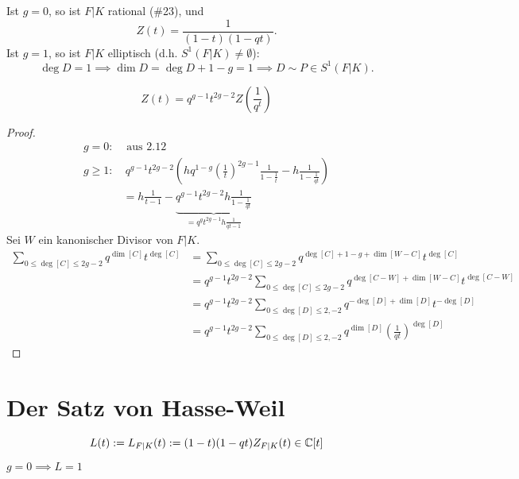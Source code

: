 \begin{beispiel}
    Ist \emph{$g=0$}, so ist $F|K$ rational (\#23), und 
    $$Z(t) = \frac{1}{(1-t)(1-qt)}.$$
    Ist \emph{$g=1$}, so ist $F|K$ elliptisch (d.h. $S^1(F|K) \ne \emptyset$):
    $$ \deg D = 1 \implies \dim D = \deg D + 1 -g = 1 \implies D \sim P \in S^1(F|K). $$
\end{beispiel}

\begin{satz}[Funktionalgleichung]
    $$ Z(t) = q^{g-1}t^{2g -2}Z\left(\frac{1}{q^t}\right) $$
\end{satz}
\begin{proof}
    \begin{align*}
        g=0:& \text{ aus 2.12}\\
        g \geq 1:&~ q^{g -1}t^{2g-2}\left(hq^{1-g}\left(\frac{1}{t}\right)^{2g -1}\frac{1}{1-\frac{1}{t}}-h\frac{1}{1-\frac{1}{qt}}\right)\\
        & = h \frac{1}{t-1} - \underbrace{q^{g-1}t^{2g-2}h\frac{1}{1-\frac{1}{qt}}}_{= q^gt^{2g-1}h\frac{1}{qt -1}}
    \end{align*}
    Sei $W$ ein kanonischer Divisor von $F|K$.
    \begin{align*}
        \sum_{0 \leq \deg [C] \leq 2g -2} q^{\dim[C]}t^{\deg [C]} &= \sum_{0 \leq \deg [C] \leq 2g -2} q^{\deg[C] + 1 - g + \dim[W-C]}t^{\deg [C]}\\
            &= q^{g -1}t^{2g-2} \sum_{0 \leq \deg [C] \leq 2g -2} q^{\deg[C-W]+\dim[W-C]}t^{\deg [C-W]}\\
            &= q^{g-1}t^{2g-2} \sum_{0 \leq \deg[D]\leq2,-2} q^{-\deg[D]+\dim[D]}t^{-\deg[D]}\\
            &= q^{g-1}t^{2g-2} \sum_{0 \leq \deg[D]\leq2,-2} q^{\dim [D]}\left(\frac{1}{qt}\right)^{\deg[D]}
    \end{align*}
\end{proof}

\section{Der Satz von Hasse-Weil}

\begin{definition}
    $$ L(t) := L_{F|K}(t): = (1-t)(1-qt)Z_{F|K}(t) \in \mathbb{C}[t] $$  
\end{definition}

\begin{beispiel}
    $g=0 \implies L=1$
\end{beispiel}

